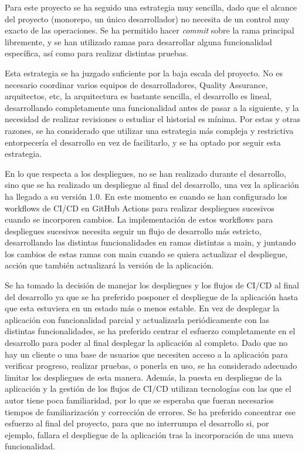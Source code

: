 Para este proyecto se ha seguido una estrategia muy sencilla, dado que el alcance del proyecto (monorepo, un único desarrollador) no necesita de un control muy exacto de las operaciones. Se ha permitido hacer \textit{commit} sobre la rama principal libremente, y se han utilizado ramas para desarrollar alguna funcionalidad específica, así como para realizar distintas pruebas.

Esta estrategia se ha juzgado suficiente por la baja escala del proyecto. No es necesario coordinar varios equipos de desarrolladores, Quality Assurance, arquitectos, etc, la arquitectura es bastante sencilla, el desarrollo es lineal, desarrollando completamente una funcionalidad antes de pasar a la siguiente,  y la necesidad de realizar revisiones  o estudiar el historial es mínima. Por estas y otras razones, se ha considerado que utilizar una estrategia más compleja y restrictiva entorpecería el desarrollo en vez de facilitarlo, y se ha optado por seguir esta estrategia.

En lo que respecta a los despliegues, no se han realizado durante el desarrollo, sino que se ha realizado un despliegue  al final del desarrollo, una vez la aplicación ha llegado a su versión 1.0. En este momento es cuando se han configurado los workflows de CI/CD en GitHub Actions para realizar despliegues sucesivos cuando se incorporen cambios. La implementación de estos workflows para despliegues sucesivos necesita seguir un flujo de desarrollo más estricto, desarrollando las distintas funcionalidades en ramas distintas a main, y juntando los cambios de estas ramas con main cuando se quiera actualizar el despliegue, acción que también actualizará la versión de la aplicación. 

Se ha tomado la decisión de manejar los despliegues y los flujos de CI/CD al final del desarrollo ya que se ha preferido posponer el despliegue de la aplicación hasta que esta estuviera en un estado más o menos estable. En vez de desplegar la aplicación con funcionalidad parcial y actualizarla periódicamente con las distintas funcionalidades, se ha preferido centrar el esfuerzo completamente en el desarrollo para poder al final desplegar la aplicación al completo. Dado que no hay un cliente o una base de usuarios que necesiten acceso a la aplicación para verificar progreso, realizar pruebas, o ponerla en uso, se ha considerado adecuado limitar los despliegues de esta manera. Además, la puesta en despliegue de la aplicación y la gestión de los flujos de CI/CD utilizan tecnologías con las que el autor tiene poca familiaridad, por lo que se esperaba que fueran necesarios tiempos de familiarización y corrección de errores. Se ha preferido concentrar ese esfuerzo al final del proyecto, para que no interrumpa el desarrollo si, por ejemplo, fallara el despliegue de la aplicación tras la incorporación de una nueva funcionalidad.


